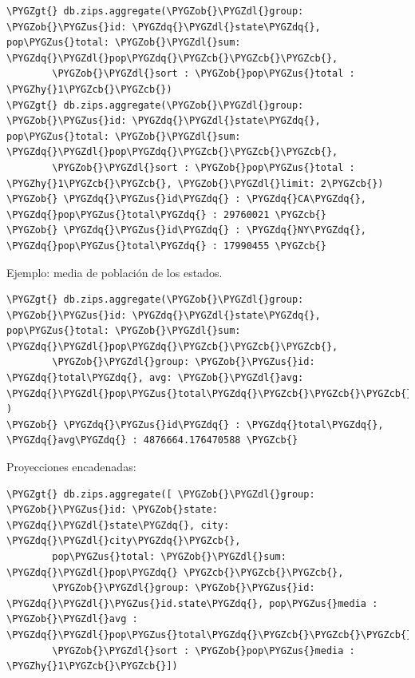 \documentclass[a4paper,10pt,english]{sphinxmanual}
\def\PYGZus{\char`\_}
\def\PYGZob{\char`\{}
\def\PYGZcb{\char`\}}
\def\PYGZgt{\char`\>}
\def\PYGZdl{\char`\$}
\def\PYGZhy{\char`\-}
\def\PYGZdq{\char`\"}
\begin{document}
\begin{Verbatim}[commandchars=\\\{\}]
\PYGZgt{} db.zips.aggregate(\PYGZob{}\PYGZdl{}group: \PYGZob{}\PYGZus{}id: \PYGZdq{}\PYGZdl{}state\PYGZdq{}, pop\PYGZus{}total: \PYGZob{}\PYGZdl{}sum: \PYGZdq{}\PYGZdl{}pop\PYGZdq{}\PYGZcb{}\PYGZcb{}\PYGZcb{},
        \PYGZob{}\PYGZdl{}sort : \PYGZob{}pop\PYGZus{}total : \PYGZhy{}1\PYGZcb{}\PYGZcb{})
\PYGZgt{} db.zips.aggregate(\PYGZob{}\PYGZdl{}group: \PYGZob{}\PYGZus{}id: \PYGZdq{}\PYGZdl{}state\PYGZdq{}, pop\PYGZus{}total: \PYGZob{}\PYGZdl{}sum: \PYGZdq{}\PYGZdl{}pop\PYGZdq{}\PYGZcb{}\PYGZcb{}\PYGZcb{},
        \PYGZob{}\PYGZdl{}sort : \PYGZob{}pop\PYGZus{}total : \PYGZhy{}1\PYGZcb{}\PYGZcb{}, \PYGZob{}\PYGZdl{}limit: 2\PYGZcb{})
\PYGZob{} \PYGZdq{}\PYGZus{}id\PYGZdq{} : \PYGZdq{}CA\PYGZdq{}, \PYGZdq{}pop\PYGZus{}total\PYGZdq{} : 29760021 \PYGZcb{}
\PYGZob{} \PYGZdq{}\PYGZus{}id\PYGZdq{} : \PYGZdq{}NY\PYGZdq{}, \PYGZdq{}pop\PYGZus{}total\PYGZdq{} : 17990455 \PYGZcb{}
\end{Verbatim}

Ejemplo: media de población de los estados.

\begin{Verbatim}[commandchars=\\\{\}]
\PYGZgt{} db.zips.aggregate(\PYGZob{}\PYGZdl{}group: \PYGZob{}\PYGZus{}id: \PYGZdq{}\PYGZdl{}state\PYGZdq{}, pop\PYGZus{}total: \PYGZob{}\PYGZdl{}sum: \PYGZdq{}\PYGZdl{}pop\PYGZdq{}\PYGZcb{}\PYGZcb{}\PYGZcb{},
        \PYGZob{}\PYGZdl{}group: \PYGZob{}\PYGZus{}id: \PYGZdq{}total\PYGZdq{}, avg: \PYGZob{}\PYGZdl{}avg: \PYGZdq{}\PYGZdl{}pop\PYGZus{}total\PYGZdq{}\PYGZcb{}\PYGZcb{}\PYGZcb{} )
\PYGZob{} \PYGZdq{}\PYGZus{}id\PYGZdq{} : \PYGZdq{}total\PYGZdq{}, \PYGZdq{}avg\PYGZdq{} : 4876664.176470588 \PYGZcb{}
\end{Verbatim}

Proyecciones encadenadas:

\begin{Verbatim}[commandchars=\\\{\}]
\PYGZgt{} db.zips.aggregate([ \PYGZob{}\PYGZdl{}group: \PYGZob{}\PYGZus{}id: \PYGZob{}state: \PYGZdq{}\PYGZdl{}state\PYGZdq{}, city: \PYGZdq{}\PYGZdl{}city\PYGZdq{}\PYGZcb{},
        pop\PYGZus{}total: \PYGZob{}\PYGZdl{}sum: \PYGZdq{}\PYGZdl{}pop\PYGZdq{} \PYGZcb{}\PYGZcb{}\PYGZcb{},
        \PYGZob{}\PYGZdl{}group: \PYGZob{}\PYGZus{}id: \PYGZdq{}\PYGZdl{}\PYGZus{}id.state\PYGZdq{}, pop\PYGZus{}media : \PYGZob{}\PYGZdl{}avg : \PYGZdq{}\PYGZdl{}pop\PYGZus{}total\PYGZdq{}\PYGZcb{}\PYGZcb{}\PYGZcb{},
        \PYGZob{}\PYGZdl{}sort : \PYGZob{}pop\PYGZus{}media : \PYGZhy{}1\PYGZcb{}\PYGZcb{}])
\end{Verbatim}
\end{document}
